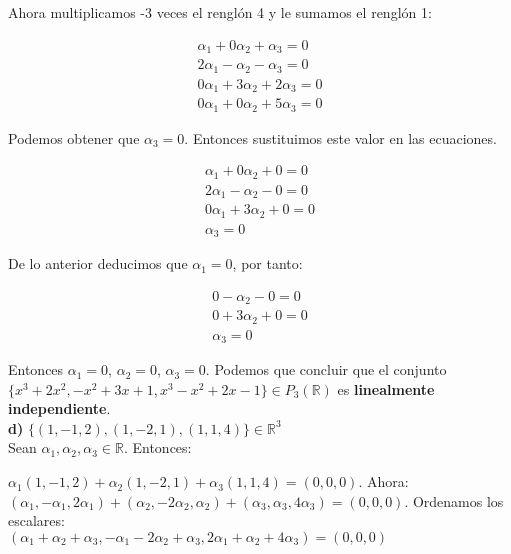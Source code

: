 \documentclass[letterpaper]{article}
\renewcommand{\*}{\cdot}
\theoremstyle{definition}
\begin{document}
Ahora multiplicamos -3 veces el renglón 4 y le sumamos el renglón 1:
\begin{center}
	\begin{align*}
	\alpha_{1}+0\alpha_{2}+\alpha_{3}=0\\
	2\alpha_{1}-\alpha_{2}-\alpha_{3}=0\\
	0\alpha_{1}+3\alpha_{2}+2\alpha_{3}=0\\
	0\alpha_{1}+0\alpha_{2}+5\alpha_{3}=0
	\end{align*}
\end{center}

Podemos obtener que $\alpha_{3}=0$. Entonces sustituimos este valor en las ecuaciones.
\begin{center}
	\begin{align*}
	\alpha_{1}+0\alpha_{2}+0=0\\
	2\alpha_{1}-\alpha_{2}-0=0\\
	0\alpha_{1}+3\alpha_{2}+0=0\\
	\alpha_{3}=0
	\end{align*}
\end{center}

De lo anterior deducimos que $\alpha_{1}= 0$, por tanto:
\begin{center}
	\begin{align*}
	0-\alpha_{2}-0=0\\
	0+3\alpha_{2}+0=0\\
	\alpha_{3}=0
	\end{align*}
\end{center}

Entonces $\alpha_{1}=0$, $\alpha_{2}=0$, $\alpha_{3}=0$. Podemos que concluir que el conjunto $\lbrace x^{3} + 2x^{2}, -x^{2} + 3x + 1, x^{3} - x^{2} + 2x -1 \rbrace \in P_{3}(\mathbb{R})$ es \textbf{linealmente independiente}.\\

\textbf{d)} $\lbrace (1,-1,2), (1,-2,1), (1,1,4) \rbrace \in \mathbb{R}^{3}$\\

Sean $\alpha_{1}, \alpha_{2}, \alpha_{3}\in \mathbb{R}$. Entonces:

$\alpha_{1}(1,-1,2)+\alpha_{2}(1,-2,1)+ \alpha_{3}(1,1,4)=(0,0,0)$.
Ahora:\\

$(\alpha_{1},-\alpha_{1},2\alpha_{1})+(\alpha_{2},-2\alpha_{2},\alpha_{2})+ (\alpha_{3},\alpha_{3},4\alpha_{3})=(0,0,0)$. Ordenamos los escalares:\\

$(\alpha_{1}+\alpha_{2}+\alpha_{3}, -\alpha_{1}-2\alpha_{2}+\alpha_{3}, 2\alpha_{1}+\alpha_{2}+4\alpha_{3})= (0,0,0)$\\
\end{document}
